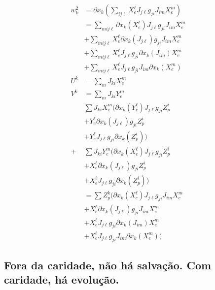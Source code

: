 \documentclass[12pt]{article}
\begin{document}
		\begin{align}
		w_k^2 &= \partial x_k \left(\sum_{ij\ell} X_e^\ell J_{j\ell} g_{ji} J_{im} X_e^m \right) \\
		 &= \sum_{mij\ell} \partial x_k (X_e^\ell) J_{j\ell} g_{ji} J_{im} X_e^m  \\
		 &+ \sum_{mij\ell} X_e^\ell \partial x_k (J_{j\ell}) g_{ji} J_{im} X_e^m  \\
		 &+ \sum_{mij\ell} X_e^\ell J_{j\ell} g_{ji} \partial x_k (J_{im}) X_e^m  \\
		 &+ \sum_{mij\ell} X_e^\ell J_{j\ell} g_{ji} J_{im} \partial x_k (X_e^m)  \\
		 U^k &= \sum_m J_{ki} X_e^m \\
		 V^k &= \sum_m J_{ki} Y_e^m \\
		&\sum J_{ki} X_e^m \bigg(\partial x_k (Y_e^\ell) J_{j\ell} g_{ji} Z_p^i \\
		 &+ Y_e^\ell \partial x_k (J_{j\ell}) g_{ji} Z_p^i \\
		 &+ Y_e^\ell J_{j\ell} g_{ji} \partial x_k (Z_p^i) \bigg) \\
		  + &\sum J_{ki} Y_e^m \bigg(\partial x_k (X_e^\ell) J_{j\ell} g_{ji} Z_p^i \\
		 &+ X_e^\ell \partial x_k (J_{j\ell}) g_{ji} Z_p^i \\
		 &+ X_e^\ell J_{j\ell} g_{ji} \partial x_k (Z_p^i) \bigg) \\
		  &= \sum Z_p^k \bigg(\partial x_k (X_e^\ell) J_{j\ell} g_{ji} J_{im} X_e^m  \\
		 &+ X_e^\ell \partial x_k (J_{j\ell}) g_{ji} J_{im} X_e^m  \\
		 &+ X_e^\ell J_{j\ell} g_{ji} \partial x_k (J_{im}) X_e^m  \\
		 &+ X_e^\ell J_{j\ell} g_{ji} J_{im} \partial x_k (X_e^m) \bigg)
		\end{align}

		\subsection{Fora da caridade, n\~ao h\'a salva\c{c}\~ao. Com caridade, h\'a evolu\c{c}\~ao.}
\end{document}
